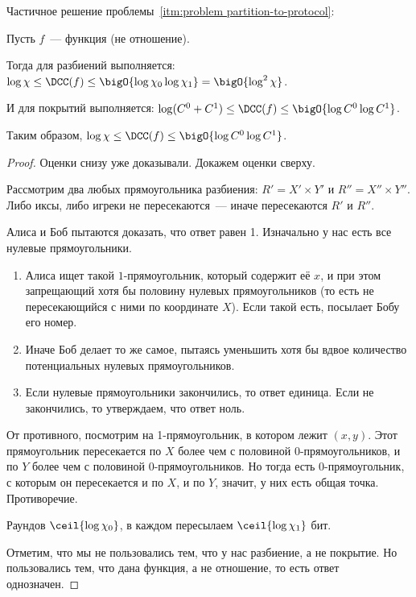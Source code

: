 Частичное решение проблемы~\ref{itm:problem partition-to-protocol}:
\begin{theorem}
    \label{D < log C0 * log C1}

    Пусть $f$~--- функция (не отношение).

    Тогда для разбиений выполняется:
    $\log \chi \le \DCC(f) \le \bigO{\log \chi_0 \log \chi_1} = \bigO{\log^2 \chi}$.

    И для покрытий выполняется:
    $\log (C^0 + C^1) \le \DCC(f) \le \bigO{\log C^0 \log C^1}$.

    Таким образом, $\log \chi \le \DCC(f) \le \bigO{\log C^0 \log C^1}$.
\end{theorem}


\begin{proof}
    Оценки снизу уже доказывали. Докажем оценки сверху.

    Рассмотрим два любых прямоугольника разбиения: $R' = X' \times Y'$ и $R'' = X'' \times Y''$. Либо
    иксы, либо игреки не пересекаются~--- иначе пересекаются $R'$ и $R''$.

    Алиса и Боб пытаются доказать, что ответ равен 1. Изначально у нас есть все нулевые прямоугольники.

    \begin{enumerate}
        \item Алиса ищет такой $1$-прямоугольник, который содержит её $x$, и при этом запрещающий хотя бы
            половину нулевых прямоугольников (то есть не пересекающийся с ними по координате $X$). Если
            такой есть, посылает Бобу его номер.
        \item Иначе Боб делает то же самое, пытаясь уменьшить хотя бы вдвое количество потенциальных
            нулевых прямоугольников.
        \item Если нулевые прямоугольники закончились, то ответ единица. Если не закончились, то
            утверждаем, что ответ ноль.
    \end{enumerate}

    От противного, посмотрим на 1-прямоугольник, в котором лежит $(x, y)$. Этот прямоугольник
    пересекается по $X$ более чем с половиной 0-прямоугольников, и по $Y$ более чем с половиной
    0-прямоугольников. Но тогда есть 0-прямоугольник, с которым он пересекается и по $X$, и по $Y$,
    значит, у них есть общая точка. Противоречие.

    Раундов $\ceil{\log \chi_0}$, в каждом пересылаем $\ceil{\log \chi_1}$ бит.

    Отметим, что мы не пользовались тем, что у нас разбиение, а не покрытие. Но пользовались тем, что
    дана функция, а не отношение, то есть ответ однозначен.
\end{proof}